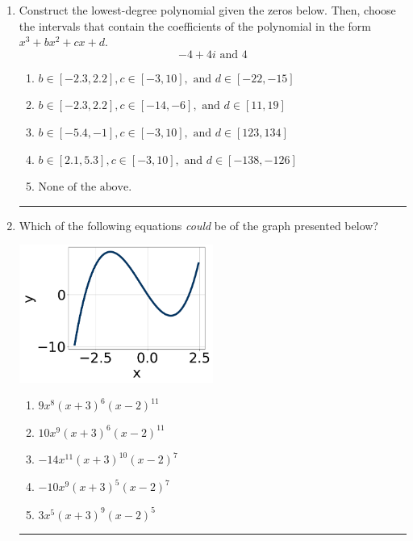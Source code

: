 \documentclass[14pt]{extbook}
\newcommand{\litem}[1]{\item#1\hspace*{-1cm}\rule{\textwidth}{0.4pt}}
\begin{document}
\begin{enumerate}
{\begin{enumerate}[label=\Alph*.]
\end{enumerate} }
\litem{
Construct the lowest-degree polynomial given the zeros below. Then, choose the intervals that contain the coefficients of the polynomial in the form $x^3+bx^2+cx+d$.\[ -4 + 4 i \text{ and } 4 \]\begin{enumerate}[label=\Alph*.]
\item \( b \in [-2.3, 2.2], c \in [-3, 10], \text{ and } d \in [-22, -15] \)
\item \( b \in [-2.3, 2.2], c \in [-14, -6], \text{ and } d \in [11, 19] \)
\item \( b \in [-5.4, -1], c \in [-3, 10], \text{ and } d \in [123, 134] \)
\item \( b \in [2.1, 5.3], c \in [-3, 10], \text{ and } d \in [-138, -126] \)
\item \( \text{None of the above.} \)

\end{enumerate} }
\litem{
Which of the following equations \textit{could} be of the graph presented below?
\begin{center}
    \includegraphics[width=0.5\textwidth]{../Figures/polyGraphToFunctionB.png}
\end{center}
\begin{enumerate}[label=\Alph*.]
\item \( 9x^{8} (x + 3)^{6} (x - 2)^{11} \)
\item \( 10x^{9} (x + 3)^{6} (x - 2)^{11} \)
\item \( -14x^{11} (x + 3)^{10} (x - 2)^{7} \)
\item \( -10x^{9} (x + 3)^{5} (x - 2)^{7} \)
\item \( 3x^{5} (x + 3)^{9} (x - 2)^{5} \)

\end{enumerate} }
\end{enumerate}
\end{document}
